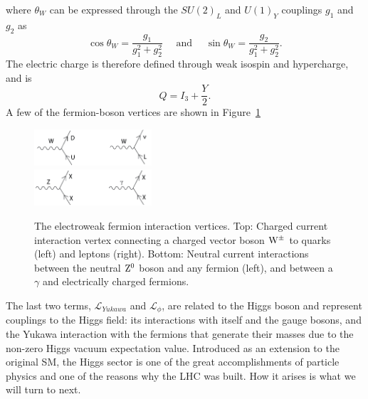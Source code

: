 where $\theta_W$ can be expressed through the $SU (2)_L$ and $U(1)_Y$ couplings $g_1$ and $g_2$ as
\begin{equation}
     \cos \theta_W = \frac{g_1}{g^2_1+g^2_2}  \quad \textrm{ and } \quad \sin \theta_W = \frac{g_2}{g^2_1+g^2_2}.        
\end{equation}
The electric charge is therefore defined through weak isospin and hypercharge, and is
\begin{equation}
  Q = I_3 + \frac{Y}{2}.
  \end{equation}
A few of the fermion-boson vertices are shown in Figure~\ref{fig:theory:weakfermionint}
  \begin{figure}[h!]
  \centering
  \includegraphics[width=0.39\textwidth]{figures/theory/ew_ch.png}\\
  \includegraphics[width=0.39\textwidth]{figures/theory/ew_neu.png}
  \caption{The electroweak fermion interaction vertices. Top: Charged current interaction vertex connecting a charged vector boson $\mathrm{W}^{\pm}$ to quarks (left) and leptons (right). Bottom: Neutral current interactions between the neutral $\mathrm{Z}^0$ boson and any fermion (left), and between a $\gamma$ and electrically charged fermions.}
  \label{fig:theory:weakfermionint}
  \end{figure}
The last two terms, $\mathcal{L}_{Yukawa}$ and $\mathcal{L}_{\phi}$, are related to the Higgs boson and represent couplings to the Higgs field: its interactions with itself and the gauge bosons, and the Yukawa interaction with the fermions that generate their masses due to the non-zero Higgs vacuum expectation value. Introduced as an extension to the original SM, the Higgs sector is one of the great accomplishments of particle physics and one of the reasons why the LHC was built. How it arises is what we will turn to next.


